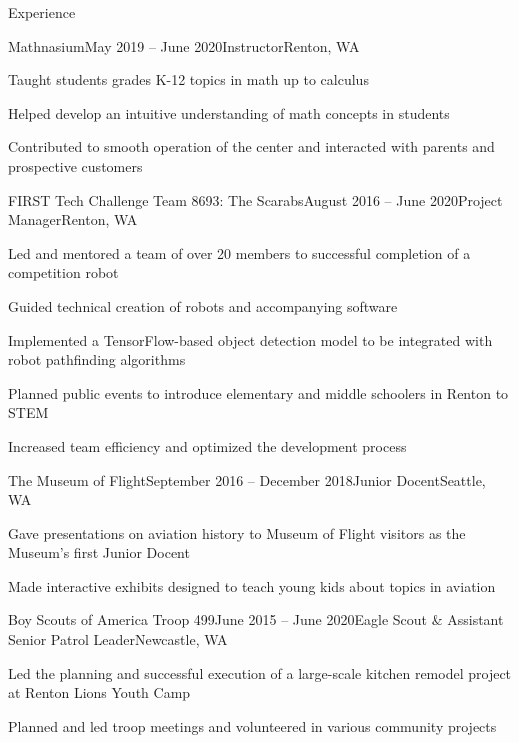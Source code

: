 \documentclass{resume} %
\begin{document}

\vspace{-1em} %
\begin{rSection}{Experience}

\begin{rSubsection}{Mathnasium}{May 2019 – June 2020}{Instructor}{Renton, WA}
\item Taught students grades K-12 topics in math up to calculus
\item Helped develop an intuitive understanding of math concepts in students
\item Contributed to smooth operation of the center and interacted with parents and prospective customers
\end{rSubsection}

\begin{rSubsection}{FIRST Tech Challenge Team 8693: The Scarabs}{August 2016 – June 2020}{Project Manager}{Renton, WA}
\item Led and mentored a team of over 20 members to successful completion of a competition robot
\item Guided technical creation of robots and accompanying software
\item Implemented a TensorFlow-based object detection model to be integrated with robot pathfinding algorithms
\item Planned public events to introduce elementary and middle schoolers in Renton to STEM
\item Increased team efficiency and optimized the development process
\end{rSubsection}

\begin{rSubsection}{The Museum of Flight}{September 2016 – December 2018}{Junior Docent}{Seattle, WA}
\item Gave presentations on aviation history to Museum of Flight visitors as the Museum's first Junior Docent
\item Made interactive exhibits designed to teach young kids about topics in aviation
\end{rSubsection}

\begin{rSubsection}{Boy Scouts of America Troop 499}{June 2015 – June 2020}{Eagle Scout \& Assistant Senior Patrol Leader}{Newcastle, WA}
\item Led the planning and successful execution of a large-scale kitchen remodel project at Renton Lions Youth Camp
\item Planned and led troop meetings and volunteered in various community projects
\end{rSubsection}

\end{rSection}
\end{document}
